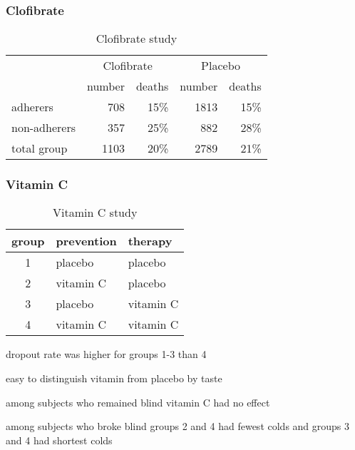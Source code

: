 \documentclass[landscape]{exam}
\begin{document}
  \subsubsection{Clofibrate}
  \begin{table}
    \centering
    \begin{tabular}{lrrrr}
      \toprule
      & \multicolumn{2}{c}{Clofibrate} & \multicolumn{2}{c}{Placebo} \\
                   & number & deaths & number & deaths \\
      \cmidrule(r){2-3} \cmidrule(r){4-5}    
      adherers     & 708    & 15\%   & 1813   & 15\% \\
      non-adherers & 357    & 25\%   & 882    & 28\% \\
      total group  & 1103   & 20\%   & 2789   & 21\% \\
      \bottomrule
    \end{tabular}
    \caption{Clofibrate study}
    \label{tab:clofibrate}
  \end{table}

  \subsubsection{Vitamin C}
  \begin{table}
    \centering
    \begin{tabular}{cll}
      \toprule
      group & prevention & therapy \\
      \midrule
      1     & placebo    & placebo \\
      2     & vitamin C  & placebo \\
      3     & placebo    & vitamin C \\
      4     & vitamin C  & vitamin C \\
    \end{tabular}
    \caption{Vitamin C study}
    \label{tab:vitamin.c}
  \end{table}

  \begin{itemize*}
    \item dropout rate was higher for groups 1-3 than 4
    \item easy to distinguish vitamin from placebo by taste
    \item among subjects who remained blind vitamin C had no effect
    \item among subjects who broke blind groups 2 and 4 had fewest colds and
      groups 3 and 4 had shortest colds
  \end{itemize*}
\end{document}

